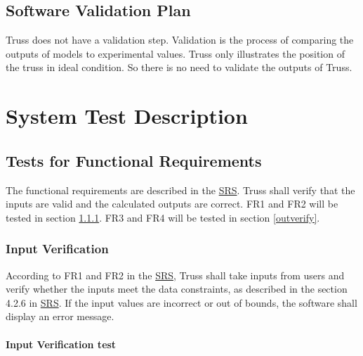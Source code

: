 \documentclass[12pt, titlepage]{article}
\begin{document}
\subsection{Software Validation Plan} \label{sftwareplan}
Truss does not have a validation step. Validation is the process of
comparing the outputs of models to experimental values. Truss only illustrates 
the position of the truss in ideal condition. So there is no need to validate 
the outputs of Truss.

\section{System Test Description} \label{sysdescript}
	
\subsection{Tests for Functional Requirements} \label{testfr}
The functional requirements are described in the 
\href{https://github.com/tingyuw/cas741/blob/master/docs/SRS/SRS.pdf}{SRS}. 
Truss shall verify that the inputs are valid and the calculated outputs are 
correct. FR1 and FR2 will be tested in section \ref{inverify}. FR3 and FR4 will 
be tested in section \ref{outverify}.

\subsubsection{Input Verification} \label{inverify}
According to FR1 and FR2 in the 
\href{https://github.com/tingyuw/cas741/blob/master/docs/SRS/SRS.pdf}{SRS}, 
Truss shall take inputs from users and verify whether the inputs meet the data 
constraints, as described in the section 4.2.6 in 
\href{https://github.com/tingyuw/cas741/blob/master/docs/SRS/SRS.pdf}{SRS}. If 
the input values are incorrect or out of bounds, the software shall display an 
error message.
		
\paragraph{Input Verification test}
\end{document}
